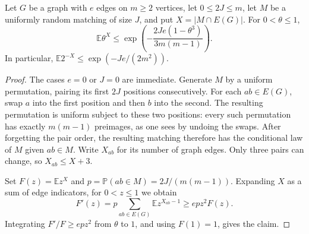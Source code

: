 \begin{lemma}\label{lem:random-matching-estimate}
Let $G$ be a graph with $e$ edges on $m\ge 2$ vertices, let $0\le 2J\le m$,
let $M$ be a uniformly random matching of size $J$, and put
$X=|M\cap E(G)|$.
For $0<\theta\le 1$,
\[
 \mathbb E\theta^X
 \le \exp\!\left(-\frac{2Je(1-\theta^3)}{3m(m-1)}\right).
\]
In particular, $\mathbb E2^{-X}\le \exp(-Je/(2m^2))$.
\end{lemma}
\begin{proof}
The cases $e=0$ or $J=0$ are immediate. Generate $M$ by a uniform
permutation, pairing its first $2J$ positions consecutively. For each
$ab\in E(G)$, swap $a$ into the first position and then $b$ into the
second. The resulting permutation is uniform subject to these two
positions: every such permutation has exactly $m(m-1)$ preimages, as one
sees by undoing the swaps. After forgetting the pair order, the resulting
matching therefore has the conditional law of $M$ given $ab\in M$.
Write $X_{ab}$ for its number of graph edges. Only three pairs can change,
so $X_{ab}\le X+3$.

Set $F(z)=\mathbb E z^X$ and $p=\mathbb P(ab\in M)=2J/(m(m-1))$.
Expanding $X$ as a sum of edge indicators, for $0<z\le 1$ we obtain
\[
 F'(z)=p\sum_{ab\in E(G)}\mathbb E z^{X_{ab}-1}
 \ge epz^2F(z).
\]
Integrating $F'/F\ge epz^2$ from $\theta$ to $1$, and using $F(1)=1$,
gives the claim.
\end{proof}
